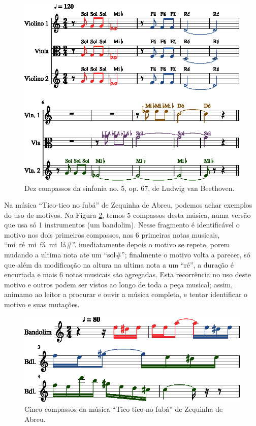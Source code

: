 \begin{figure}[!h]
  \centering
    \includegraphics[width=\workboxsize]{chapters/cap-musica-composer/Symphony5Op67-out-1.eps}
\caption{Dez compassos da sinfonia no. 5, op. 67, de Ludwig van Beethoven.}
\label{fig:10Symphony5Op67}
\end{figure}

\begin{example}
Na música ``Tico-tico no fubá'' de Zequinha de Abreu, podemos achar exemplos do uso de motivos. 
Na Figura \ref{fig:Tico-tico_no_fuba-1}, temos 5 compassos desta música,
numa versão que usa só 1 instrumentos (um bandolim).
Nesse fragmento é identificável o motivo nos dois primeiros compassos, 
nas 6 primeiras notas musicais, ``mi~ré~mi~fá~mi~lá$\#$''.
imediatamente depois o motivo se repete, porem mudando a ultima nota ate um ``sol$\#$'';
finalmente o motivo volta a parecer, só que além da modificação na altura na ultima nota a um ``ré'',
a duração é encurtada e mais 6 notas musicais são agregadas.
Esta recorrência no uso deste motivo e outros podem ser vistos ao longo de toda a peça musical;
assim, animamo ao leitor a procurar e ouvir a música completa, e tentar identificar o motivo e suas mutações. 
\end{example}
\begin{figure}[!h]
  \centering
    \includegraphics[width=\workboxsize]{chapters/cap-musica-composer/Tico-tico_no_fuba-1.eps}
\caption{Cinco compassos da música ``Tico-tico no fubá'' de Zequinha de Abreu.}
\label{fig:Tico-tico_no_fuba-1}
\end{figure}

